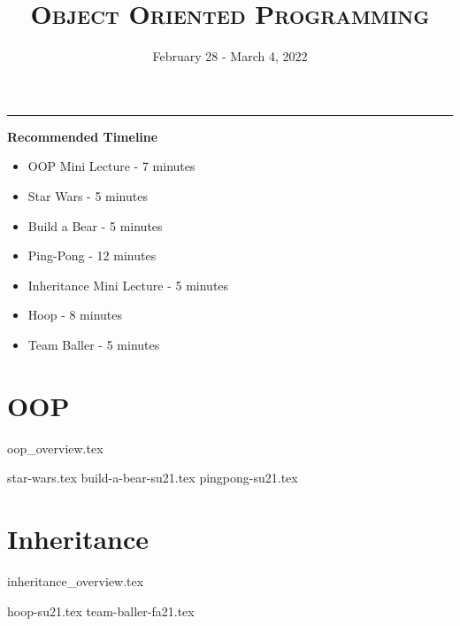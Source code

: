 \documentclass{exam}
\title{\textsc{Object Oriented Programming}}
\date{February 28 - March 4, 2022}
\begin{document}
\maketitle
\rule{\textwidth}{0.15em}
\fontsize{12}{15}\selectfont


\begin{guide}
    \textbf{Recommended Timeline}
        \begin{itemize}
            \item OOP Mini Lecture - 7 minutes
            \item Star Wars - 5 minutes
            \item Build a Bear - 5 minutes
            \item Ping-Pong - 12 minutes
            \item Inheritance Mini Lecture - 5 minutes
            \item Hoop - 8 minutes
            \item Team Baller - 5 minutes
        \end{itemize}
\end{guide}

\section{OOP}
{oop_overview.tex}
\newpage
\begin{questions}
{star-wars.tex}
\newpage
{build-a-bear-su21.tex}
{pingpong-su21.tex}
\end{questions}

\newpage
\section{Inheritance}
{inheritance_overview.tex}
\begin{questions}
{hoop-su21.tex}
{team-baller-fa21.tex}
\end{questions}
\end{document}
